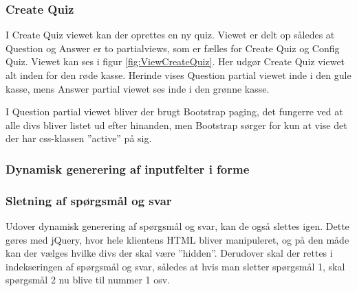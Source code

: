 \subsubsection{Create Quiz}
I Create Quiz viewet kan der oprettes en ny quiz. Viewet er delt op således at Question og Answer er to partialviews, som er fælles for Create Quiz og Config Quiz. Viewet kan ses i figur \ref{fig:ViewCreateQuiz}. Her udgør Create Quiz viewet alt inden for den røde kasse. Herinde vises Question partial viewet inde i den gule kasse, mens Answer partial viewet ses inde i den grønne kasse.


I Question partial viewet bliver der brugt Bootstrap paging, det fungerre ved at alle divs bliver listet ud efter hinanden, men Bootstrap sørger for kun at vise det der har css-klassen ''active'' på sig.

\subsubsection*{Dynamisk generering af inputfelter i forme}

\subsubsection*{Sletning af spørgsmål og svar}
Udover dynamisk generering af spørgsmål og svar, kan de også slettes igen. Dette gøres med jQuery, hvor hele klientens HTML bliver manipuleret, og på den måde kan der vælges hvilke divs der skal være ''hidden''. Derudover skal der rettes i indekseringen af spørgsmål og svar, således at hvis man sletter spørgsmål 1, skal spørgsmål 2 nu blive til nummer 1 osv.